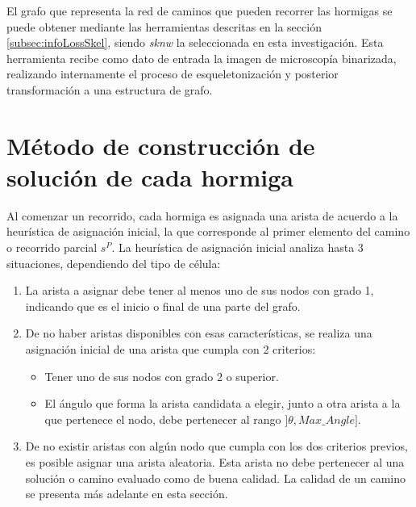 El grafo que representa la red de caminos que pueden recorrer las hormigas se puede obtener mediante las herramientas descritas en la secci\'on \ref{subsec:infoLossSkel}, siendo {\it sknw} la seleccionada en esta investigaci\'on. Esta herramienta recibe como dato de entrada la imagen de microscop\'ia binarizada, realizando internamente el proceso de esqueletonizaci\'on y posterior transformaci\'on a una estructura de grafo.


\section{M\'etodo de construcci\'on de soluci\'on de cada hormiga}
\label{subsubsec:antTourInit}
Al comenzar un recorrido, cada hormiga es asignada una arista de acuerdo a la heur\'istica de asignaci\'on inicial, la que corresponde al primer elemento del camino o recorrido parcial $s^{P}$. La heur\'istica de asignaci\'on inicial analiza hasta 3 situaciones, dependiendo del tipo de c\'elula:
\begin{enumerate}
\item La arista a asignar debe tener al menos uno de sus nodos con grado 1, indicando que es el inicio o final de una parte del grafo.

\item De no haber aristas disponibles con esas caracter\'isticas, se realiza una asignaci\'on inicial de una arista que cumpla con 2 criterios:
\begin{itemize}
    \item Tener uno de sus nodos con grado 2 o superior.
    \item El \'angulo que forma la arista candidata a elegir, junto a otra arista a la que pertenece el nodo, debe pertenecer al rango $]\theta, Max\_Angle]$.
\end{itemize}

\item De no existir aristas con alg\'un nodo que cumpla con los dos criterios previos, es posible asignar una arista aleatoria. Esta arista no debe pertenecer al una soluci\'on o camino evaluado como de buena calidad. La calidad de un camino se presenta m\'as adelante en esta secci\'on.
\end{enumerate}

